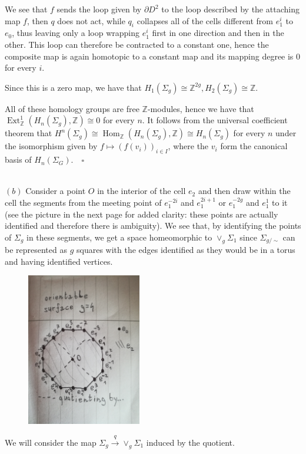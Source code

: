 \documentclass{article}
\newcommand{\numberset}{\mathbb}
\newcommand{\Z}{\numberset{Z}}
\DeclareMathOperator{\Ext}{Ext}
\DeclareMathOperator{\Hom}{Hom}
\begin{document}
We see that $f$ sends the loop given by $\partial D^2$ to the loop
described by the attaching map $f$, then $q$ does not act, while $q_i$ collapses
all of the cells different from $e^i_1$ to $e_0$, thus leaving only a
loop wrapping $e^i_1$ first in one direction and then in the other. This loop
can therefore be contracted to a constant one, hence the composite map is again
homotopic to a constant map and its mapping degree is 0 for every $i$.

Since this is a zero map, we have that
$H_1(\Sigma_g)\cong\Z^{2g},H_2(\Sigma_g)\cong\Z$.

All of these homology groups are free $\Z$-modules, hence we have that
$\Ext^1_{\Z}(H_n(\Sigma_g),\Z)\cong 0$ for every $n$. It follows from the
universal coefficient theorem that
$H^n(\Sigma_g)\cong\Hom_{\Z}(H_n(\Sigma_g),\Z)\cong H_n(\Sigma_g)$ for every
$n$ under the isomorphism given by $f\mapsto (f(v_i))_{i\in I}$, where the $v_i$
form the canonical basis of $H_n(\Sigma_G)$.$\quad\square$

~\\
\proof $(b)$ Consider a point $O$ in the interior of the cell $e_2$ and then
draw within the cell the segments from the meeting point of $e_1^{-2i}$ and
$e_1^{2i+1}$ or $e^{-2g}_1$ and $e^1_1$ to
it (see the picture in the next page for added clarity: these points are
actually identified and therefore there is ambiguity). We see that, by
identifying the points of $\Sigma_g$ in these segments,
we get a space homeomorphic to $\vee_g\Sigma_1$ since $\Sigma_{g/\sim}$ can be
represented as $g$ squares with the edges identified as they would be in a torus
and having identified vertices.
\begin{figure}[h!]
    \includegraphics[width=5cm]{IMG_20190307_130206.jpg}
\end{figure}

We will consider the map $\Sigma_g\xrightarrow{q}\vee_g\Sigma_1$ induced by the
quotient.
\end{document}
